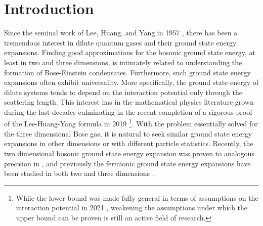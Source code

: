  \chapter{Introduction}
Since the seminal work of Lee, Huang, and Yang in 1957 \cite{lee1957eigenvalues, lee1957many, huang1957quantum}, there has been a tremendous interest in dilute quantum gases and their ground state energy expansions. Finding good approximations for the bosonic ground state energy, at least in two and three dimensions, is intimately related to understanding the formation of Bose-Einstein condensates. Furthermore, such ground state energy expansions often exhibit universality. More specifically, the ground state energy of dilute systems tends to depend on the interaction potential only through the scattering length. This interest has in the mathematical physics literature grown during the last decades culminating in the recent completion of a rigorous proof of the Lee-Huang-Yang formula in 2019 \cite{yau2009second,fournais2020energy}\footnote{While the lower bound was made fully general in terms of assumptions on the interaction potential in 2021 \cite{fournais2021energy}, weakening the assumptions under which the upper bound can be proven is still an active field of research. }. With the problem essentially solved for the three dimensional Bose gas, it is natural to seek similar ground state energy expansions in other dimensions or with different particle statistics. Recently, the two dimensional bosonic ground state energy expansion was proven to analogous precision in \cite{fournais2022ground}, and previously the fermionic ground state energy expansions have been studied in both two and three dimensions \cite{lieb2005ground}.


